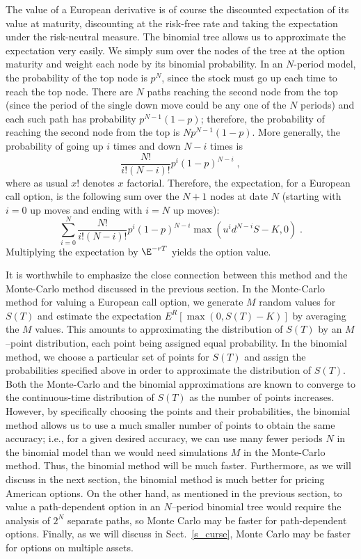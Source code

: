  
The value of a European derivative is of course the discounted expectation of its value at maturity, discounting at the risk-free rate and taking the expectation under the risk-neutral measure.  The binomial tree allows us to approximate the expectation very easily.  We simply sum over the nodes of the tree at the option maturity and weight each node by its binomial probability.  In an $N$-period model, the probability of the top node is $p^N$, since the stock must go up each time to reach the top node.  There are $N$ paths reaching the second node from the top (since the period of the single down move could be any one of the $N$ periods) and each such path has probability $p^{N-1}(1-p)$; therefore, the probability of reaching the second node from the top is $Np^{N-1}(1-p)$.  More generally, the probability of going up $i$ times and down $N-i$ times is
$$\frac{N!}{i!(N-i)!}p^i(1-p)^{N-i}\; ,$$
where as usual $x!$ denotes $x$ factorial.  Therefore, the expectation, for a European call option,  is the following sum over the $N+1$ nodes at date $N$ (starting with $i=0$ up moves and ending with $i=N$ up moves):
\begin{equation}\label{binomialsum}
\sum_{i=0}^N \frac{N!}{i!(N-i)!}p^i(1-p)^{N-i}\max(u^id^{N-i}S-K,0)\;.
\end{equation}
Multiplying the expectation by $\E^{-rT}$ yields the option value.

It is worthwhile to emphasize the close connection between this method and the Monte-Carlo method discussed in the previous section.  In the Monte-Carlo method for valuing a European call option, we generate $M$ random values for $S(T)$ and estimate the expectation $E^R[\max(0,S(T)-K)]$ by averaging the $M$ values.  This amounts to approximating the distribution of $S(T)$ by an $M$--point distribution, each point being assigned equal probability.  In the binomial method, we choose a particular set of points for $S(T)$ and assign the probabilities specified above in order to approximate the distribution of $S(T)$.  Both the Monte-Carlo and the binomial approximations are known to converge to the continuous-time distribution of $S(T)$ as the number of points increases.  However, by specifically choosing the points and their probabilities, the binomial method allows us to use a much smaller number of points to obtain the same accuracy; i.e., for a given desired accuracy, we can use many fewer periods $N$ in the binomial model than we would need simulations $M$ in the Monte-Carlo method.  Thus, the binomial method will be much faster.   Furthermore, as we will discuss in the next section, the binomial method is much better for pricing American options.  On the other hand, as mentioned in the previous section, to value a path-dependent option in  an $N$--period binomial tree would require the analysis of $2^N$ separate paths, so Monte Carlo may be faster for path-dependent options.  Finally, as we will discuss in Sect.~\ref{s_curse}, Monte Carlo may be faster for options on multiple assets.



